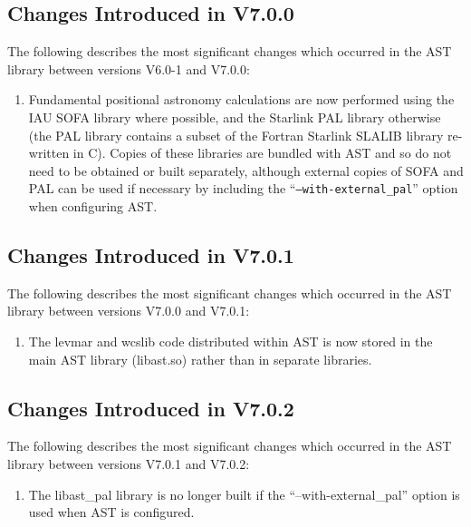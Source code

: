 \documentclass[twoside,11pt]{article}
\begin{document}
\subsection{Changes Introduced in V7.0.0}

The following describes the most significant changes which
occurred in the AST library between versions V6.0-1 and V7.0.0:

\begin{enumerate}

\item Fundamental positional astronomy calculations are now performed
using the IAU SOFA library where possible, and the Starlink PAL library
otherwise (the PAL library contains a subset of the Fortran Starlink SLALIB
library re-written in C). Copies of these libraries are bundled with AST
and so do not need to be obtained or built separately, although external
copies of SOFA and PAL can be used if necessary by including the
``{\tt --with-external\_pal}'' option when configuring AST.

\end{enumerate}

\subsection{Changes Introduced in V7.0.1}

The following describes the most significant changes which
occurred in the AST library between versions V7.0.0 and V7.0.1:

\begin{enumerate}

\item The levmar and wcslib code distributed within AST is now stored in the
main AST library (libast.so) rather than in separate libraries.

\end{enumerate}

\subsection{Changes Introduced in V7.0.2}

The following describes the most significant changes which
occurred in the AST library between versions V7.0.1 and V7.0.2:

\begin{enumerate}

\item The libast\_pal library is no longer built if the
``--with-external\_pal'' option is used when AST is configured.

\end{enumerate}
\end{document}
